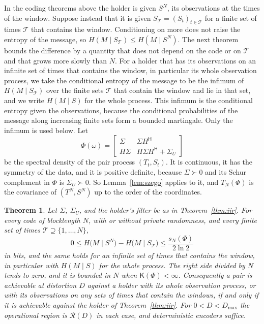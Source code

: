 \documentclass[11pt,onecolumn]{IEEEtran}
\newtheorem{theorem}{Theorem}
\newcommand{\herm}{\mathsf H}
\begin{document}
In the coding theorems above the holder is given $S^N$, its
observations at the times of the window. Suppose instead that it is
given $S_{\mathcal T}=(S_t)_{t\in\mathcal T}$ for a finite set of times
$\mathcal T$ that contains the window. Conditioning on more does not
raise the entropy of the message, so $H(M\mid S_{\mathcal T})\le H(M\mid S^N)$.
The next theorem bounds the difference by a quantity that does not
depend on the code or on $\mathcal T$ and that grows more slowly than
$N$. For a holder that has its observations on an infinite set of
times that contains the window, in particular its whole observation
process, we take the conditional entropy of the message to be the
infimum of $H(M\mid S_{\mathcal T})$ over the finite sets $\mathcal T$
that contain the window and lie in that set, and we write $H(M\mid S)$
for the whole process. This infimum is the conditional entropy given
the observations, because the conditional probabilities of the message
along increasing finite sets form a bounded martingale. Only the
infimum is used below. Let
\[
\Phi(\omega)=\begin{bmatrix}\Sigma&\Sigma H^{\herm}\\ H\Sigma&H\Sigma H^{\herm}+\Sigma_U\end{bmatrix}
\]
be the spectral density of the pair process $(T_t,S_t)$. It is
continuous, it has the symmetry of the data, and it is positive
definite, because $\Sigma\succ0$ and its Schur complement in $\Phi$ is
$\Sigma_U\succ0$. So Lemma~\ref{lem:szego} applies to it, and $T_N(\Phi)$
is the covariance of $(T^N,S^N)$ up to the order of the coordinates.

\begin{theorem}\label{thm:whole}
Let $\Sigma$, $\Sigma_U$, and the holder's filter be as in
Theorem~\ref{thm:iir}. For every code of blocklength $N$, with or
without private randomness, and every finite set of times
$\mathcal T\supseteq\{1,\dots,N\}$,
\begin{equation}
0\le H\bigl(M\mid S^N\bigr)-H\bigl(M\mid S_{\mathcal T}\bigr)\le\frac{s_N(\Phi)}{2\ln2}
\label{eq:wholebound}
\end{equation}
in bits, and the same holds for an infinite set of times that contains
the window, in particular with $H(M\mid S)$ for the whole process. The
right side divided by $N$ tends to zero, and it is bounded in $N$ when
$\mathsf K(\Phi)<\infty$. Consequently a pair is achievable at
distortion $D$ against a holder with its whole observation process, or
with its observations on any sets of times that contain the windows, if
and only if it is achievable against the holder of
Theorem~\ref{thm:iir}. For $0<D<D_{\max}$ the operational region is
$\mathcal R(D)$ in each case, and deterministic encoders suffice.
\end{theorem}
\end{document}
